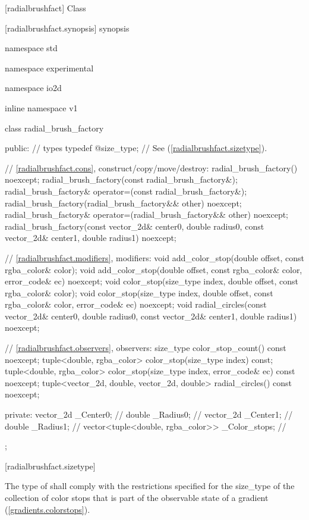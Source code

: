  [radialbrushfact] {Class }

 [radialbrushfact.synopsis] { synopsis}

\begin{codeblock}
namespace std { namespace experimental { namespace io2d { inline namespace v1 {
  class radial_brush_factory {
  public:
    // types
    typedef @\impdef@          size_type; // See (\ref{radialbrushfact.sizetype}).
    
    // \ref{radialbrushfact.cons}, construct/copy/move/destroy:
    radial_brush_factory() noexcept;
    radial_brush_factory(const radial_brush_factory&);
    radial_brush_factory& operator=(const radial_brush_factory&);
    radial_brush_factory(radial_brush_factory&& other) noexcept;
    radial_brush_factory& operator=(radial_brush_factory&& other) noexcept;
    radial_brush_factory(const vector_2d& center0, double radius0,
      const vector_2d& center1, double radius1) noexcept;

    // \ref{radialbrushfact.modifiers}, modifiers:
    void add_color_stop(double offset, const rgba_color& color);
    void add_color_stop(double offset, const rgba_color& color,
      error_code& ec) noexcept;
    void color_stop(size_type index, double offset, const rgba_color& color);
    void color_stop(size_type index, double offset, const rgba_color& color,
      error_code& ec) noexcept;
    void radial_circles(const vector_2d& center0, double radius0,
      const vector_2d& center1, double radius1) noexcept;

    // \ref{radialbrushfact.observers}, observers:
    size_type color_stop_count() const noexcept;
    tuple<double, rgba_color> color_stop(size_type index) const;
    tuple<double, rgba_color> color_stop(size_type index,
      error_code& ec) const noexcept;
    tuple<vector_2d, double, vector_2d, double> radial_circles() const noexcept;

  private:
    vector_2d _Center0;                             // \expos
    double _Radius0;                                // \expos
    vector_2d _Center1;                             // \expos
    double _Radius1;                                // \expos
    vector<tuple<double, rgba_color>> _Color_stops; // \expos
  };
} } } }
\end{codeblock}

 [radialbrushfact.sizetype] {}

\pnum
The type of  shall comply with the restrictions specified for the size_type of the collection of color stops that is part of the observable state of a gradient (\ref{gradients.colorstops}).

